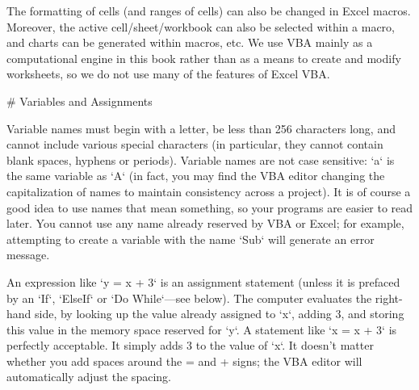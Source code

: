 The formatting of cells (and ranges of cells) can also be changed in Excel macros.  Moreover, the active cell/sheet/workbook can also be selected within a macro, and charts can be generated within macros, etc.  We use VBA mainly as a computational engine in this book rather than as a means to create and modify worksheets, so we do not use many of the features of Excel VBA.

# Variables and Assignments

Variable names must begin with a letter, be less than 256 characters
long, and cannot include various special characters (in particular, they
cannot contain blank spaces, hyphens or periods). Variable names are not
case sensitive: `a` is the same variable as `A` (in fact, you may find
the VBA editor changing the capitalization of names to maintain
consistency across a project). It is of course a good idea to use names
that mean something, so your programs are easier to read later. You
cannot use any name already reserved by VBA or Excel; for example,
attempting to create a variable with the name `Sub` will generate an
error message.

An expression like `y = x + 3` is an assignment statement (unless it is
prefaced by an `If`, `ElseIf` or `Do While`---see below). The computer
evaluates the right-hand side, by looking up the value already assigned
to `x`, adding 3, and storing this value in the memory space reserved
for `y`. A statement like `x = x + 3` is perfectly acceptable. It simply
adds 3 to the value of `x`. It doesn't matter whether you add spaces
around the = and + signs; the VBA editor will automatically adjust the
spacing.

